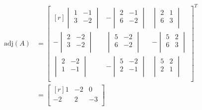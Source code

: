 \documentclass{article}
\begin{document}
\begin{align*}
  \text{adj}(A)&=\begin{bmatrix}[r]
    \begin{vmatrix}
      1 &-1   \\
       3&-2   \\
    \end{vmatrix} &-\begin{vmatrix}
      2 &-1   \\
       6&-2   \\
    \end{vmatrix}  &\begin{vmatrix}
      2 &1   \\
       6&3   \\
    \end{vmatrix}   \\[4mm]
     -\begin{vmatrix}
      2 &-2   \\
       3&-2   \\
     \end{vmatrix}&\begin{vmatrix}
      5 &-2   \\
       6&-2   \\
     \end{vmatrix}  &-\begin{vmatrix}
      5 &2   \\
       6&3   \\
     \end{vmatrix}   \\[4mm]
     \begin{vmatrix}
      2 &-2   \\
       1&-1   \\
     \end{vmatrix}&  -\begin{vmatrix}
      5 &-2   \\
       2&-1   \\
     \end{vmatrix}&\begin{vmatrix}
      5 &2   \\
       2&1   \\
     \end{vmatrix}   \\
  \end{bmatrix}^T\\
  &=\begin{bmatrix}[r]
     1&-2  &0   \\
     -2&2  &-3   \\

\end{bmatrix}
\end{align*}
\end{document}
